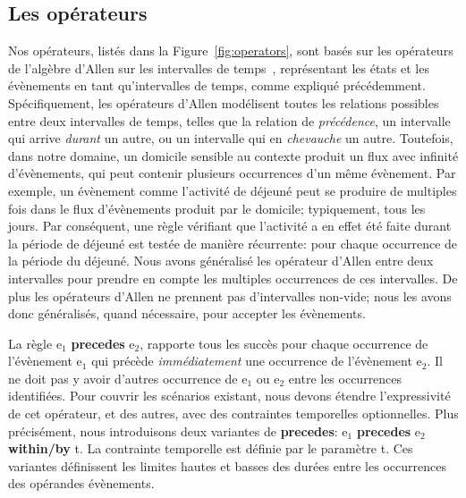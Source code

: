 \subsection{Les opérateurs}
Nos opérateurs, listés dans la Figure~\ref{fig:operators}, sont basés sur les opérateurs de l'algèbre d'Allen sur les intervalles de temps~\cite{Allen}, représentant les états et les évènements en tant qu'intervalles de temps, comme expliqué précédemment. Spécifiquement, les opérateurs d'Allen modélisent toutes les relations possibles entre deux intervalles de temps, telles que la relation de {\em précédence}, un intervalle qui arrive {\em durant} un autre, ou un intervalle qui en {\em chevauche} un autre. Toutefois, dans notre domaine, un domicile sensible au contexte produit un flux avec infinité d'évènements, qui peut contenir plusieurs occurrences d'un même évènement. Par exemple, un évènement comme l'activité de déjeuné peut se produire de multiples fois dans le flux d'évènements produit par le domicile; typiquement, tous les jours. Par conséquent, une règle vérifiant que l'activité a en effet été faite durant la période de déjeuné est testée de manière récurrente: pour chaque occurrence de la période du déjeuné. 
Nous avons généralisé les opérateur d'Allen entre deux intervalles pour prendre en compte les multiples occurrences de ces intervalles. De plus les opérateurs d'Allen ne prennent pas d'intervalles non-vide; nous les avons donc généralisés, quand nécessaire, pour accepter les évènements.




La règle {\ttfamily e$_1$ {\bf precedes} e$_2$}, rapporte tous les succès pour chaque occurrence de l'évènement {\ttfamily e$_1$} qui précède {\em immédiatement} une occurrence de l'évènement {\ttfamily e$_2$}. Il ne doit pas y avoir d'autres occurrence de {\ttfamily e$_1$} ou {\ttfamily e$_2$} entre les occurrences identifiées. Pour couvrir les scénarios existant, nous devons étendre l'expressivité de cet opérateur, et des autres, avec des contraintes temporelles optionnelles. Plus précisément, nous introduisons deux variantes de {\ttfamily \bf precedes}: {\ttfamily e$_1$ {\bf precedes} e$_2$ {\bf within/by} t}. La contrainte temporelle est définie par le paramètre {\ttfamily t}. Ces variantes définissent les limites hautes et basses des durées entre les occurrences des opérandes évènements.

